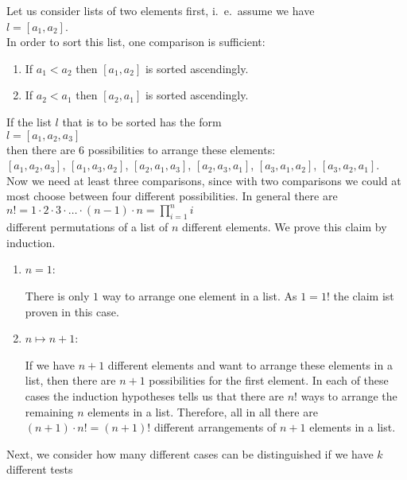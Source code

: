 Let us consider lists of two elements first, i.~e.~assume we have
\\[0.2cm]
\hspace*{1.3cm}
$l = [a_1, a_2]$.  
\\[0.2cm]
In order to sort this list, one comparison is sufficient:
\begin{enumerate}
 \item If $a_1 < a_2$ then $[a_1, a_2]$ is sorted ascendingly.
 \item If $a_2 < a_1$ then $[a_2, a_1]$ is sorted ascendingly.
\end{enumerate}
If the list $l$ that is to be sorted has the form
\\[0.2cm]
\hspace*{1.3cm}
$l = [a_1,a_2,a_3]$ 
\\[0.2cm]
then there are 6 possibilities to arrange these elements:
\\[0.2cm]
\hspace*{0.3cm}
$[a_1,a_2,a_3]$, \quad
$[a_1,a_3,a_2]$, \quad
$[a_2,a_1,a_3]$, \quad
$[a_2,a_3,a_1]$, \quad
$[a_3,a_1,a_2]$, \quad
$[a_3,a_2,a_1]$. 
\\[0.2cm]
Now we need at least three comparisons, since with two comparisons we could at most choose between
four different possibilities.
In general there are 
\\[0.2cm]
\hspace*{1.3cm}
$n! = 1 \cdot 2 \cdot 3 \cdot {\dots} \cdot (n-1) \cdot n = \prod\limits_{i=1}^n i$ 
\\[0.2cm]
different permutations of a list of $n$ different elements. 
We prove this claim by induction. 
\begin{enumerate}
\item $n=1$:  

      There is only $1$ way to arrange one element in a list.  As $1 = 1!$ the claim ist proven
      in this case.
\item $n \mapsto n+1$:
  
      If we have $n+1$ different elements and want to arrange these elements in a list, then there
      are $n+1$ possibilities for the first element.  In each of these cases the induction
      hypotheses tells us that there are $n!$ ways to arrange the remaining $n$ elements in a list.
      Therefore, all in all there are $(n+1) \cdot n! = (n+1)!$ different arrangements of $n+1$
      elements in a list.
\end{enumerate}
Next, we consider how many different cases can be distinguished if we have $k$ different tests
